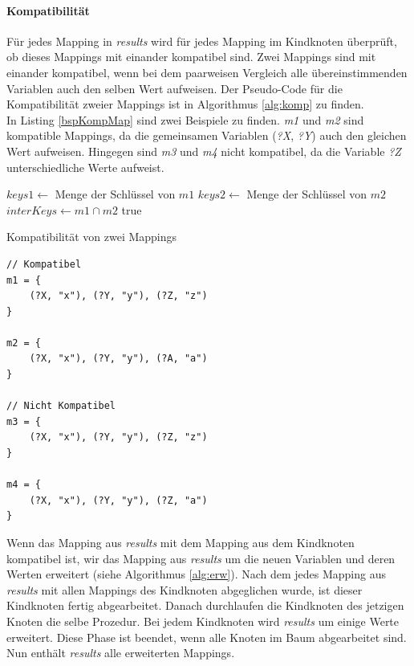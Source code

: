 \documentclass[draft,final]{vutinfth} %
\begin{document}
\paragraph{Kompatibilität}
Für jedes Mapping in \textit{results} wird für jedes Mapping im Kindknoten überprüft, ob dieses Mappings mit einander kompatibel sind. Zwei Mappings sind mit einander kompatibel, wenn bei dem paarweisen Vergleich alle übereinstimmenden Variablen auch den selben Wert aufweisen. Der Pseudo-Code für die Kompatibilität zweier Mappings ist in Algorithmus \ref{alg:komp} zu finden. \\ In Listing \ref{bspKompMap} sind zwei Beispiele zu finden. \textit{m1} und \textit{m2} sind kompatible Mappings, da die gemeinsamen Variablen (\textit{?X}, \textit{?Y}) auch den gleichen Wert aufweisen. Hingegen sind \textit{m3} und \textit{m4} nicht kompatibel, da die Variable \textit{?Z} unterschiedliche Werte aufweist.

\begin{algorithm}
\BlankLine
$keys1\leftarrow$ Menge der Schlüssel von $m1$\;
$keys2\leftarrow$ Menge der Schlüssel von $m2$\;
$interKeys\leftarrow m1\cap m2$\;
\Return true\;
\caption{Kompatibilität von zwei Mappings}\label{alg:komp}
\end{algorithm}

\begin{lstlisting}[float,caption={Beispiele für Kompatibilität von zwei Mappings},frame=single,label={bspKompMap}]
// Kompatibel
m1 = {
	(?X, "x"), (?Y, "y"), (?Z, "z")	
}

m2 = {
	(?X, "x"), (?Y, "y"), (?A, "a")	
}

// Nicht Kompatibel
m3 = {
	(?X, "x"), (?Y, "y"), (?Z, "z")	
}

m4 = {
	(?X, "x"), (?Y, "y"), (?Z, "a")	
}
\end{lstlisting}

Wenn das Mapping aus \textit{results} mit dem Mapping aus dem Kindknoten kompatibel ist, wir das Mapping aus \textit{results} um die neuen Variablen und deren Werten erweitert (siehe Algorithmus \ref{alg:erw}). Nach dem jedes Mapping aus \textit{results} mit allen Mappings des Kindknoten abgeglichen wurde, ist dieser Kindknoten fertig abgearbeitet. Danach durchlaufen die Kindknoten des jetzigen Knoten die selbe Prozedur. Bei jedem Kindknoten wird \textit{results} um einige Werte erweitert. Diese Phase ist beendet, wenn alle Knoten im Baum abgearbeitet sind. Nun enthält \textit{results} alle erweiterten Mappings.
\end{document}
